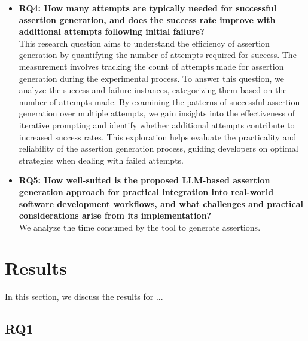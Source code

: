 \begin{itemize}
    \item \textbf{RQ4: How many attempts are typically needed for successful assertion generation, and does the success rate improve with additional attempts following initial failure?}\\
    This research question aims to understand the efficiency of assertion generation by quantifying the number of attempts required for success. The measurement involves tracking the count of attempts made for assertion generation during the experimental process. To answer this question, we analyze the success and failure instances, categorizing them based on the number of attempts made. By examining the patterns of successful assertion generation over multiple attempts, we gain insights into the effectiveness of iterative prompting and identify whether additional attempts contribute to increased success rates. This exploration helps evaluate the practicality and reliability of the assertion generation process, guiding developers on optimal strategies when dealing with failed attempts.
    
    \item \textbf{RQ5: How well-suited is the proposed LLM-based assertion generation approach for practical integration into real-world software development workflows, and what challenges and practical considerations arise from its implementation?}\\
    We analyze the time consumed by the tool to generate assertions.
    
\end{itemize}

\section{Results}
\label{sec:results}
\vspace{0.2 cm}

In this section, we discuss the results for ... 

\vspace{0.1 cm}
\subsection{RQ1}
\label{sec:results_rq1}
\vspace{0.1 cm}

